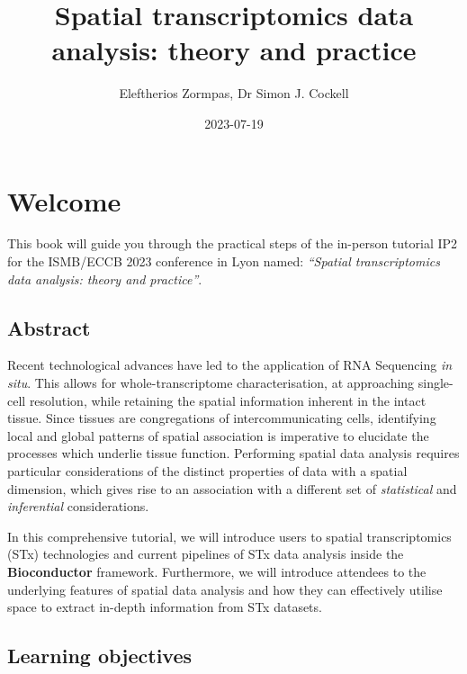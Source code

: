 \documentclass[
]{book}
\title{Spatial transcriptomics data analysis: theory and practice}
\author{Eleftherios Zormpas, Dr Simon J. Cockell}
\date{2023-07-19}
\begin{document}
\maketitle

{
\setcounter{tocdepth}{1}
\tableofcontents
}
\hypertarget{welcome}{%
\chapter*{Welcome}\label{welcome}}

This book will guide you through the practical steps of the in-person tutorial IP2 for the ISMB/ECCB 2023 conference in Lyon named: \emph{``Spatial transcriptomics data analysis: theory and practice''}.

\hypertarget{abstract}{%
\section*{Abstract}\label{abstract}}

Recent technological advances have led to the application of RNA Sequencing \emph{in situ}. This allows for whole-transcriptome characterisation, at approaching single-cell resolution, while retaining the spatial information inherent in the intact tissue. Since tissues are congregations of intercommunicating cells, identifying local and global patterns of spatial association is imperative to elucidate the processes which underlie tissue function. Performing spatial data analysis requires particular considerations of the distinct properties of data with a spatial dimension, which gives rise to an association with a different set of \emph{statistical} and \emph{inferential} considerations.

In this comprehensive tutorial, we will introduce users to spatial transcriptomics (STx) technologies and current pipelines of STx data analysis inside the \textbf{Bioconductor} framework. Furthermore, we will introduce attendees to the underlying features of spatial data analysis and how they can effectively utilise space to extract in-depth information from STx datasets.

\hypertarget{learning-objectives}{%
\section*{Learning objectives}\label{learning-objectives}}
\end{document}
